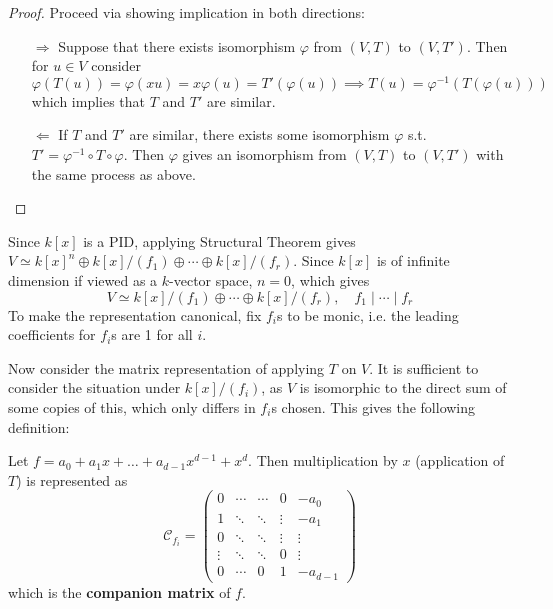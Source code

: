 \documentclass{article}
\begin{document}
\begin{proof}
    Proceed via showing implication in both directions:
    \begin{itemize}
        \item[$\Rightarrow$] Suppose that there exists isomorphism $\varphi$ from $(V, T)$ to $(V, T')$. Then for $u\in V$ consider
        \[
            \varphi(T(u)) = \varphi(xu) = x \varphi(u) = T'(\varphi(u)) \implies T(u) = \varphi^{-1}(T(\varphi(u)))
        \]
        which implies that $T$ and $T'$ are similar.
        \item[$\Leftarrow$] If $T$ and $T'$ are similar, there exists some isomorphism $\varphi$ s.t. $T' = \varphi^{-1}\circ T\circ\varphi$. Then $\varphi$ gives an isomorphism from $(V, T)$ to $(V, T')$ with the same process as above.
    \end{itemize}
\end{proof}

Since $k[x]$ is a PID, applying Structural Theorem gives $V \simeq k[x]^n \oplus k[x]/(f_1) \oplus \cdots \oplus k[x]/(f_r)$. Since $k[x]$ is of infinite dimension if viewed as a $k$-vector space, $n = 0$, which gives 
\begin{equation}\tag{$\ast$}\label{eq:(V, T) structure}
    V \simeq k[x]/(f_1) \oplus \cdots \oplus k[x]/(f_r), \quad f_1 \mid \cdots \mid f_r
\end{equation}
To make the representation canonical, fix $f_i$s to be monic, i.e. the leading coefficients for $f_i$s are 1 for all $i$. 

Now consider the matrix representation of applying $T$ on $V$. It is sufficient to consider the situation under $k[x]/(f_i)$, as $V$ is isomorphic to the direct sum of some copies of this, which only differs in $f_i$s chosen. This gives the following definition:

\begin{definition}
    Let $f = a_0 + a_1 x + \ldots + a_{d-1}x^{d-1} + x^d$. Then multiplication by $x$ (application of $T$) is represented as
    \[
        \mathcal{C}_{f_i} = \begin{pmatrix}
            0       & \cdots  & \cdots  & 0      & -a_0   \\
            1       & \ddots  & \ddots  & \vdots & -a_1   \\
            0       & \ddots  & \ddots  & \vdots & \vdots \\
            \vdots  & \ddots  & \ddots  & 0      & \vdots \\
            0       & \cdots  & 0       & 1      & -a_{d-1}
        \end{pmatrix}
    \]
    which is the \textbf{companion matrix} of $f$. 
\end{definition}
\end{document}
